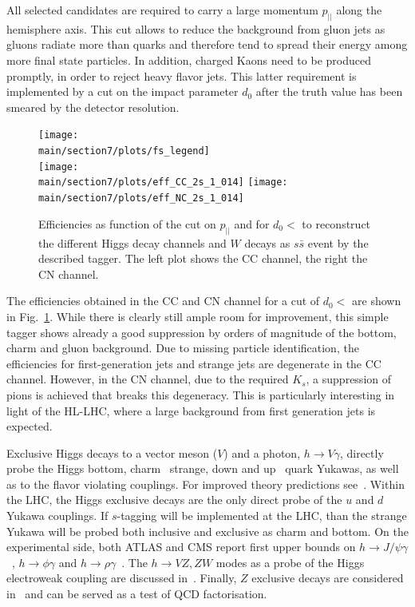 \documentclass[../report.tex]{subfiles}
\providecommand{\main}{..}
\begin{document}
All selected candidates are required to carry a large momentum $p_{||}$ along the hemisphere
axis. This cut allows to reduce the background from gluon jets as gluons radiate more than quarks
and therefore tend to spread their energy among more final state particles. In addition, charged Kaons need to be produced promptly, in order to reject heavy flavor jets. This latter requirement is implemented by a cut on the impact parameter $d_0$ after the truth value has been smeared by the detector resolution.
\begin{figure}[t]
  \centering
  \texttt{[image: \\main/section7/plots/fs\_legend]}\\
  \texttt{[image: \\main/section7/plots/eff\_CC\_2s\_1\_014]}
  \texttt{[image: \\main/section7/plots/eff\_NC\_2s\_1\_014]}
  \caption{Efficiencies as function of the cut on $p_{||}$ and for $d_0<$ to
    reconstruct the different Higgs decay channels and $W$ decays as $s\bar s$ event by the
    described tagger. The left plot shows the CC channel, the right the CN channel.}
  \label{fig:stagger-efficiencies}
\end{figure}

The efficiencies obtained in the CC and CN channel for a cut of $d_0<$ are shown in
Fig.~\ref{fig:stagger-efficiencies}. While there is clearly still ample room for improvement, this
simple tagger shows already a good suppression by orders of magnitude of the bottom, charm and gluon
background. Due to missing particle identification, the efficiencies for first-generation jets and
strange jets are degenerate in the CC channel. However, in the CN channel, due to the required
$K_s$, a suppression of pions is achieved that breaks this degeneracy. This is particularly
interesting in light of the HL-LHC, where a large background from first generation jets is expected.


\label{sec:exclusiveHiggs}

Exclusive Higgs decays to a vector meson ($V$) and a photon, $h\to V\gamma$, directly probe the Higgs bottom, charm~\cite{Bodwin:2013gca,Bodwin:2014bpa} strange, down and up~\cite{Kagan:2014ila} quark Yukawas, as well as to the flavor violating couplings. 
For improved theory predictions see~\cite{Koenig:2015pha}.
Within the LHC, the Higgs exclusive decays are the only direct probe of the $u$ and $d$ Yukawa couplings. If $s$-tagging will be implemented at the LHC, than the strange Yukawa will be probed both inclusive and exclusive as charm and bottom.  
On the experimental side, both ATLAS and CMS report first upper bounds on $h\to J/\psi\gamma$~\cite{Aad:2015sda,Khachatryan:2015lga}, $h\to\phi\gamma$ and $h\to\rho\gamma$~\cite{Aaboud:2016rug,Aaboud:2017xnb}. 
The $h \to VZ, ZW$ modes as a probe of the Higgs electroweak coupling are discussed  in~\cite{Isidori:2013cla}. 
Finally, $Z$ exclusive decays are considered in~\cite{Grossmann:2015lea,Alte:2015dpo} and can be served as a test of QCD factorisation. 
\end{document}
